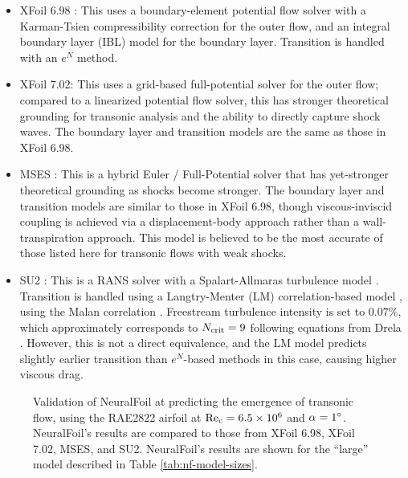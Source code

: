     \begin{itemize}
        \item XFoil 6.98 \cite{drela_xfoil_1989}: This uses a boundary-element potential flow solver with a Karman-Tsien compressibility correction for the outer flow, and an integral boundary layer (IBL) model for the boundary layer. Transition is handled with an $e^N$ method.
        \item XFoil 7.02: This uses a grid-based full-potential solver for the outer flow; compared to a linearized potential flow solver, this has stronger theoretical grounding for transonic analysis and the ability to directly capture shock waves. The boundary layer and transition models are the same as those in XFoil 6.98.
        \item MSES \cite{drela_user_2007}: This is a hybrid Euler / Full-Potential solver that has yet-stronger theoretical grounding as shocks become stronger. The boundary layer and transition models are similar to those in XFoil 6.98, though viscous-inviscid coupling is achieved via a displacement-body approach rather than a wall-transpiration approach. This model is believed to be the most accurate of those listed here for transonic flows with weak shocks.
        \item SU2 \cite{economon_su2_2016}: This is a RANS solver with a Spalart-Allmaras turbulence model \cite{spalart_oneequation_1992}. Transition is handled using a Langtry-Menter (LM) correlation-based model \cite{menter_correlationbased_2006}, using the Malan correlation \cite{menter_oneequation_2015}. Freestream turbulence intensity is set to $0.07\%$, which approximately corresponds to $N_{\rm crit}=9$ following equations from Drela \cite{drela_flight_2013}. However, this is not a direct equivalence, and the LM model predicts slightly earlier transition than $e^{N}$-based methods in this case, causing higher viscous drag.
    \end{itemize}

    \begin{figure}[H]
        \centering
        
        \caption{Validation of NeuralFoil at predicting the emergence of transonic flow, using the RAE2822 airfoil at $\rm Re_c=6.5 \times 10^6$ and $\alpha=1\degree$. NeuralFoil's results are compared to those from XFoil 6.98, XFoil 7.02, MSES, and SU2. NeuralFoil's results are shown for the ``large'' model described in Table \ref{tab:nf-model-sizes}.}
        \label{fig:nf-transonic-validation}
    \end{figure}

